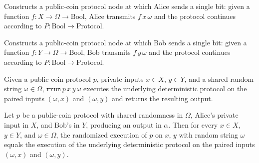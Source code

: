\begin{definition}
\label{CommunicationComplexity.PublicCoin.Protocol.alice}
\leanok
{}
Constructs a public-coin protocol node at which Alice sends a single bit: given a
function $f : X \to \Omega \to \mathrm{Bool}$, Alice transmits $f\,x\,\omega$ and
the protocol continues according to $P : \mathrm{Bool} \to \mathrm{Protocol}$.
\end{definition}

\begin{definition}
\label{CommunicationComplexity.PublicCoin.Protocol.bob}
\leanok
{}
Constructs a public-coin protocol node at which Bob sends a single bit: given a
function $f : Y \to \Omega \to \mathrm{Bool}$, Bob transmits $f\,y\,\omega$ and
the protocol continues according to $P : \mathrm{Bool} \to \mathrm{Protocol}$.
\end{definition}

\begin{definition}
\label{CommunicationComplexity.PublicCoin.Protocol.rrun}
\leanok
{}
Given a public-coin protocol $p$, private inputs $x \in X$, $y \in Y$, and a shared
random string $\omega \in \Omega$, $\texttt{rrun}\,p\,x\,y\,\omega$ executes the
underlying deterministic protocol on the paired inputs $(\omega, x)$ and $(\omega, y)$
and returns the resulting output.
\end{definition}

\begin{theorem}
\label{CommunicationComplexity.PublicCoin.Protocol.rrun_eq}
\leanok
{}
Let $p$ be a public-coin protocol with shared randomness in $\Omega$, Alice's private
input in $X$, and Bob's in $Y$, producing an output in $\alpha$. Then for every $x \in
X$, $y \in Y$, and $\omega \in \Omega$, the randomized execution of $p$ on $x$, $y$ with
random string $\omega$ equals the execution of the underlying deterministic protocol on
the paired inputs $(\omega, x)$ and $(\omega, y)$.
\end{theorem}

